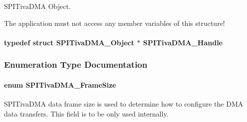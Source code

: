 S\+P\+I\+Tiva\+D\+M\+A Object. 

The application must not access any member variables of this structure! 
\paragraph[{S\+P\+I\+Tiva\+D\+M\+A\+\_\+\+Handle}]{\setlength{\rightskip}{0pt plus 5cm}typedef struct {\bf S\+P\+I\+Tiva\+D\+M\+A\+\_\+\+Object} $\ast$ {\bf S\+P\+I\+Tiva\+D\+M\+A\+\_\+\+Handle}}\label{_s_p_i_tiva_d_m_a_8h_a4848d0474d4445327fb598373df1a8e3}


\subsubsection{Enumeration Type Documentation}
\paragraph[{S\+P\+I\+Tiva\+D\+M\+A\+\_\+\+Frame\+Size}]{\setlength{\rightskip}{0pt plus 5cm}enum {\bf S\+P\+I\+Tiva\+D\+M\+A\+\_\+\+Frame\+Size}}\label{_s_p_i_tiva_d_m_a_8h_a65cb55b42cf383ece69876f50ba2d0a4}


S\+P\+I\+Tiva\+D\+M\+A data frame size is used to determine how to configure the D\+M\+A data transfers. This field is to be only used internally. 

